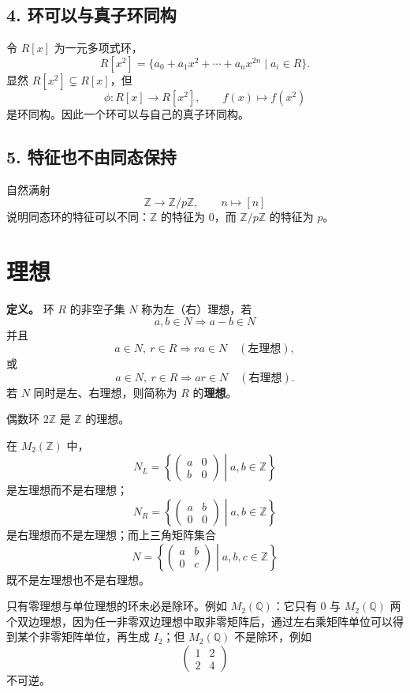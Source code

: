\subsection*{4. 环可以与真子环同构}

令 $R[x]$ 为一元多项式环，
\[
R[x^2]=\{a_0+a_1x^2+\cdots+a_nx^{2n}\mid a_i\in R\}.
\]
显然 $R[x^2]\subsetneq R[x]$，但
\[
\phi:R[x]\longrightarrow R[x^2],
\qquad
f(x)\longmapsto f(x^2)
\]
是环同构。因此一个环可以与自己的真子环同构。

\subsection*{5. 特征也不由同态保持}

自然满射
\[
\mathbb Z\longrightarrow\mathbb Z/p\mathbb Z,
\qquad n\longmapsto[n]
\]
说明同态环的特征可以不同：$\mathbb Z$ 的特征为 $0$，而 $\mathbb Z/p\mathbb Z$ 的特征为 $p$。

\section{理想}

\textbf{定义。} 环 $R$ 的非空子集 $N$ 称为左（右）理想，若
\[
a,b\in N\Longrightarrow a-b\in N
\]
并且
\[
a\in N,\ r\in R\Longrightarrow ra\in N
\quad(\text{左理想}),
\]
或
\[
a\in N,\ r\in R\Longrightarrow ar\in N
\quad(\text{右理想}).
\]
若 $N$ 同时是左、右理想，则简称为 $R$ 的\textbf{理想}。

偶数环 $2\mathbb Z$ 是 $\mathbb Z$ 的理想。

在 $M_2(\mathbb Z)$ 中，
\[
N_L=\left\{\begin{pmatrix}a&0\\b&0\end{pmatrix}\middle|a,b\in\mathbb Z\right\}
\]
是左理想而不是右理想；
\[
N_R=\left\{\begin{pmatrix}a&b\\0&0\end{pmatrix}\middle|a,b\in\mathbb Z\right\}
\]
是右理想而不是左理想；而上三角矩阵集合
\[
N=\left\{\begin{pmatrix}a&b\\0&c\end{pmatrix}\middle|a,b,c\in\mathbb Z\right\}
\]
既不是左理想也不是右理想。

只有零理想与单位理想的环未必是除环。例如 $M_2(\mathbb Q)$：它只有 $0$ 与 $M_2(\mathbb Q)$ 两个双边理想，因为任一非零双边理想中取非零矩阵后，通过左右乘矩阵单位可以得到某个非零矩阵单位，再生成 $I_2$；但 $M_2(\mathbb Q)$ 不是除环，例如
\[
\begin{pmatrix}1&2\\2&4\end{pmatrix}
\]
不可逆。

